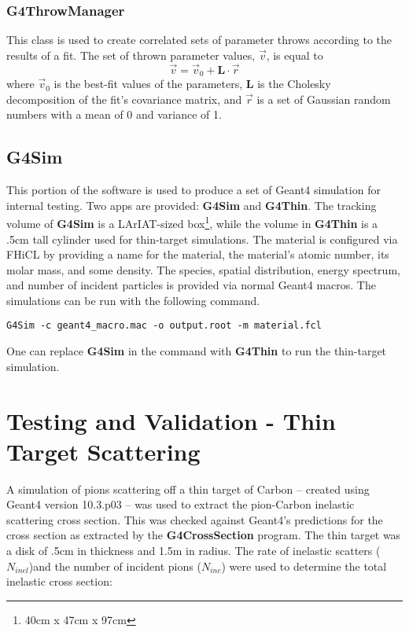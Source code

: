 \documentclass[12pt]{article}
\begin{document}
\subsubsection{G4ThrowManager}
This class is used to create correlated sets of parameter throws according to the results of a fit. The set of thrown parameter values, $\overrightarrow{v}$, is equal to
\begin{equation}
\vec{v} = \vec{v}_0 + \textbf{L} \cdot \vec{r}
\end{equation}
where $\vec{v}_0$ is the best-fit values of the parameters, $\textbf{L}$ is the Cholesky decomposition of the fit's covariance matrix, and $\vec{r}$ is a set of Gaussian random numbers with a mean of 0 and variance of 1.
 
\subsection{G4Sim}
This portion of the software is used to produce a set of Geant4 simulation for internal testing. Two apps are provided: \textbf{G4Sim} and \textbf{G4Thin}. The tracking volume of \textbf{G4Sim} is a LArIAT-sized box\footnote{40cm x 47cm x 97cm}, while the volume in \textbf{G4Thin} is a .5cm tall cylinder used for thin-target simulations. The material is configured via FHiCL by providing a name for the material, the material's atomic number, its molar mass, and some density. The species, spatial distribution, energy spectrum, and number of incident particles is provided via normal Geant4 macros. The simulations can be run with the following command.

\begin{lstlisting}
G4Sim -c geant4_macro.mac -o output.root -m material.fcl
\end{lstlisting}
One can replace \textbf{G4Sim} in the command with \textbf{G4Thin} to run the thin-target simulation.

\section{Testing and Validation - Thin Target Scattering}
A simulation of pions scattering off a thin target of Carbon -- created using Geant4 version 10.3.p03 -- was used to extract the pion-Carbon inelastic scattering cross section. 
This was checked against Geant4's predictions for the cross section as extracted by the \textbf{G4CrossSection} program.
The thin target was a disk of .5cm in thickness and 1.5m in radius. The rate of inelastic scatters ($N_{inel}$)and the number of incident pions ($N_{inc}$) were used to determine the total inelastic cross section: 
\end{document}
